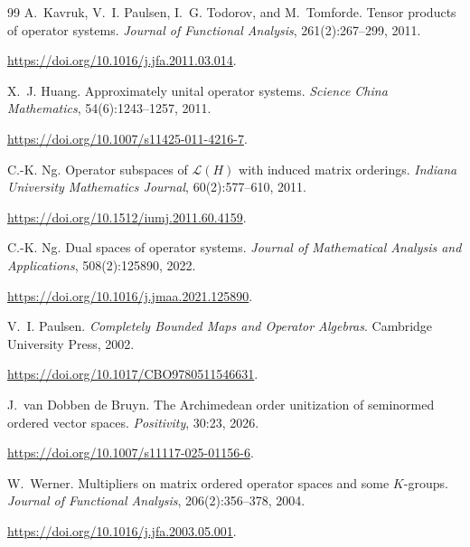 \documentclass[11pt,onecolumn]{article}
\theoremstyle{plain}
\theoremstyle{definition}
\begin{document}
\begin{thebibliography}{99}
A.~Kavruk, V.~I. Paulsen, I.~G. Todorov, and M.~Tomforde.
\newblock Tensor products of operator systems.
\newblock \emph{Journal of Functional Analysis}, 261(2):267--299, 2011.

\newblock \url{https://doi.org/10.1016/j.jfa.2011.03.014}.


X.~J. Huang.
\newblock Approximately unital operator systems.
\newblock \emph{Science China Mathematics}, 54(6):1243--1257, 2011.

\newblock \url{https://doi.org/10.1007/s11425-011-4216-7}.

C.-K. Ng.
\newblock Operator subspaces of $\mathcal L(H)$ with induced matrix orderings.
\newblock \emph{Indiana University Mathematics Journal}, 60(2):577--610, 2011.

\newblock \url{https://doi.org/10.1512/iumj.2011.60.4159}.

C.-K. Ng.
\newblock Dual spaces of operator systems.
\newblock \emph{Journal of Mathematical Analysis and Applications}, 508(2):125890, 2022.

\newblock \url{https://doi.org/10.1016/j.jmaa.2021.125890}.

V.~I. Paulsen.
\newblock \emph{Completely Bounded Maps and Operator Algebras}.
\newblock Cambridge University Press, 2002.

\newblock \url{https://doi.org/10.1017/CBO9780511546631}.


J.~van Dobben de Bruyn.
\newblock The Archimedean order unitization of seminormed ordered vector spaces.
\newblock \emph{Positivity}, 30:23, 2026.

\newblock \url{https://doi.org/10.1007/s11117-025-01156-6}.

W.~Werner.
\newblock Multipliers on matrix ordered operator spaces and some $K$-groups.
\newblock \emph{Journal of Functional Analysis}, 206(2):356--378, 2004.

\newblock \url{https://doi.org/10.1016/j.jfa.2003.05.001}.

\end{thebibliography}
\end{document}
